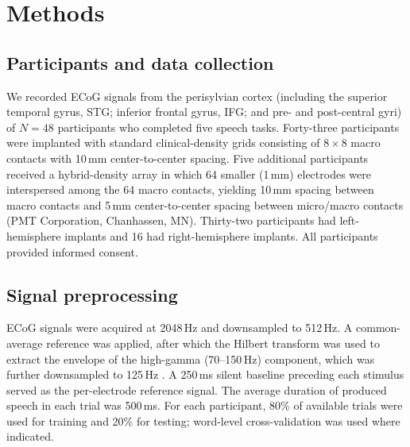 \documentclass[11pt]{article}
\begin{document}
\section{Methods}

\subsection{Participants and data collection}
We recorded ECoG signals from the perisylvian cortex (including the superior temporal gyrus, STG; inferior frontal gyrus, IFG; and pre- and post-central gyri) of $N=48$ participants who completed five speech tasks. Forty-three participants were implanted with standard clinical-density grids consisting of $8\times 8$ macro contacts with 10\,mm center-to-center spacing. Five additional participants received a hybrid-density array in which 64 smaller (1\,mm) electrodes were interspersed among the 64 macro contacts, yielding 10\,mm spacing between macro contacts and 5\,mm center-to-center spacing between micro/macro contacts (PMT Corporation, Chanhassen, MN). Thirty-two participants had left-hemisphere implants and 16 had right-hemisphere implants. All participants provided informed consent.

\subsection{Signal preprocessing}
ECoG signals were acquired at 2048\,Hz and downsampled to 512\,Hz. A common-average reference was applied, after which the Hilbert transform was used to extract the envelope of the high-gamma (70--150\,Hz) component, which was further downsampled to 125\,Hz \cite{crone1998functional,ray2011different}. A 250\,ms silent baseline preceding each stimulus served as the per-electrode reference signal. The average duration of produced speech in each trial was 500\,ms. For each participant, 80\% of available trials were used for training and 20\% for testing; word-level cross-validation was used where indicated.
\end{document}
